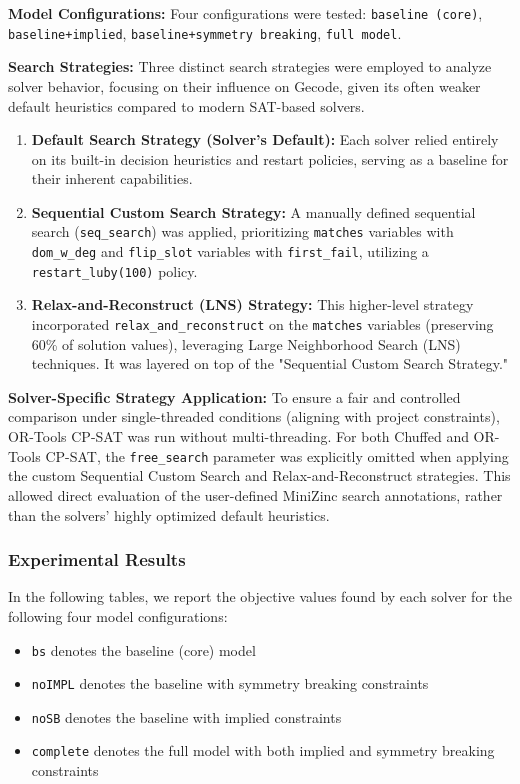 \textbf{Model Configurations:}
Four configurations were tested: \texttt{baseline (core)}, \texttt{baseline+implied}, \texttt{baseline+symmetry breaking}, \texttt{full model}.

\textbf{Search Strategies:}
Three distinct search strategies were employed to analyze solver behavior, focusing on their influence on Gecode, given its often weaker default heuristics compared to modern SAT-based solvers.

\begin{enumerate}
    \item \textbf{Default Search Strategy (Solver's Default):} Each solver relied entirely on its built-in decision heuristics and restart policies, serving as a baseline for their inherent capabilities.

    \item \textbf{Sequential Custom Search Strategy:} A manually defined sequential search (\texttt{seq\_search}) was applied, prioritizing \texttt{matches} variables with \texttt{dom\_w\_deg} and \texttt{flip\_slot} variables with \texttt{first\_fail}, utilizing a \\ \texttt{restart\_luby(100)} policy.

    \item \textbf{Relax-and-Reconstruct (LNS) Strategy:} This higher-level strategy incorporated \texttt{relax\_and\_reconstruct} on the \texttt{matches} variables (preserving 60\% of solution values), leveraging Large Neighborhood Search (LNS) techniques. It was layered on top of the "Sequential Custom Search Strategy."
\end{enumerate}

\textbf{Solver-Specific Strategy Application:}
To ensure a fair and controlled comparison under single-threaded conditions (aligning with project constraints), OR-Tools CP-SAT was run without multi-threading. For both Chuffed and OR-Tools CP-SAT, the \texttt{free\_search} parameter was explicitly omitted when applying the custom Sequential Custom Search and Relax-and-Reconstruct strategies. This allowed direct evaluation of the user-defined MiniZinc search annotations, rather than the solvers' highly optimized default heuristics.


\subsubsection{Experimental Results}
In the following tables, we report the objective values found by each solver for the following four model configurations:
\begin{itemize}
    \item \texttt{bs} denotes the baseline (core) model
     \item  \texttt{noIMPL} denotes the baseline with symmetry breaking constraints
    \item \texttt{noSB} denotes the baseline with implied constraints
    \item \texttt{complete} denotes the full model with both implied and symmetry breaking constraints
\end{itemize}

